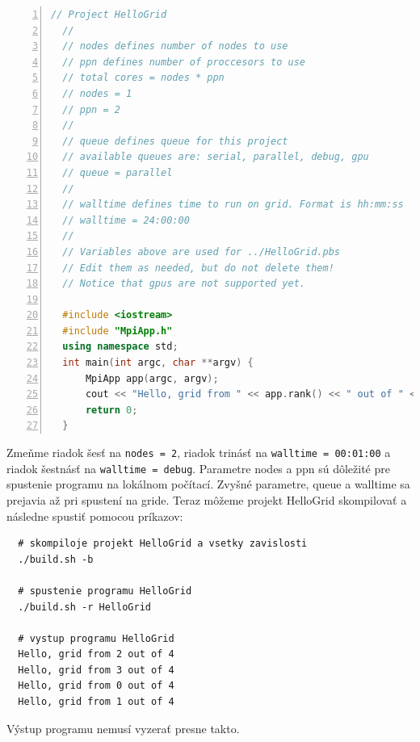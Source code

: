 \begin{lstlisting}[language=c++, caption={HelloGrid/src/main.cpp}, numbers=left]
  // Project HelloGrid
  //
  // nodes defines number of nodes to use
  // ppn defines number of proccesors to use
  // total cores = nodes * ppn
  // nodes = 1
  // ppn = 2
  //
  // queue defines queue for this project
  // available queues are: serial, parallel, debug, gpu
  // queue = parallel
  //
  // walltime defines time to run on grid. Format is hh:mm:ss
  // walltime = 24:00:00
  //
  // Variables above are used for ../HelloGrid.pbs
  // Edit them as needed, but do not delete them!
  // Notice that gpus are not supported yet.
  
  #include <iostream>
  #include "MpiApp.h"
  using namespace std;
  int main(int argc, char **argv) {
      MpiApp app(argc, argv);
      cout << "Hello, grid from " << app.rank() << " out of " << app.size() << endl;
      return 0;
  }
\end{lstlisting}
Zmeňme riadok šesť na \texttt{nodes = 2}, riadok trinásť na \texttt{walltime = 00:01:00} a riadok šestnásť na \texttt{walltime = debug}.
Parametre nodes a ppn sú dôležité pre spustenie programu na lokálnom počítací. Zvyšné parametre, queue a walltime sa prejavia až pri spustení na gride.
Teraz môžeme projekt HelloGrid skompilovať a následne spustiť pomocou príkazov:
\begin{lstlisting}
  # skompiloje projekt HelloGrid a vsetky zavislosti
  ./build.sh -b

  # spustenie programu HelloGrid
  ./build.sh -r HelloGrid

  # vystup programu HelloGrid
  Hello, grid from 2 out of 4
  Hello, grid from 3 out of 4
  Hello, grid from 0 out of 4
  Hello, grid from 1 out of 4
\end{lstlisting}
Výstup programu nemusí vyzerať presne takto.

